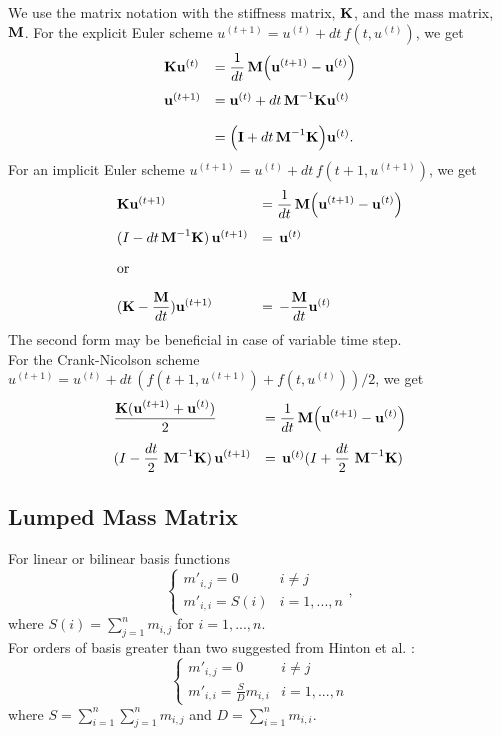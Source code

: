 We use the matrix notation with the stiffness matrix, $\textbf{K}$, and the mass matrix, $\textbf{M}$. For the explicit Euler scheme $u^{(t+1)} = u^{(t)} + dt\,f(t,u^{(t)})$, we get 
\begin{equation*}
  \begin{array}{lll}
    \textbf{K}\textbf{u}^{(t)} &= \displaystyle\frac{\displaystyle{1}}{\displaystyle{dt}}\, \textbf{M}\Big(\textbf{u}^{(t+1)} - \textbf{u}^{(t)}\Big)\\[4mm]
    \textbf{u}^{(t+1)} &= \textbf{u}^{(t)} + dt \,\textbf{M}^{-1}\textbf{K}\textbf{u}^{(t)}\\[4mm]
                 &= \Big(\textbf{I} + dt \,\textbf{M}^{-1}\textbf{K}\Big)\textbf{u}^{(t)}
                .
  \end{array}
\end{equation*}
For an implicit Euler scheme $u^{(t+1)} = u^{(t)} + dt\,f(t+1,u^{(t+1)})$, we get 
\begin{equation*}
  \begin{array}{lll}
    \textbf{K}\textbf{u}^{(t+1)} &= \displaystyle\frac{\displaystyle{1}}{\displaystyle{dt}}\, \textbf{M}\Big(\textbf{u}^{(t+1)} - \textbf{u}^{(t)}\Big)\\[4mm]
     (I - dt\,\textbf{M}^{-1}\textbf{K})\,\textbf{u}^{(t+1)}&= \,\textbf{u}^{(t)}\\[1em] \textrm{or}\\[1em]
     \displaystyle(\textbf{K}-\frac{\textbf{M}}{dt})\textbf{u}^{(t+1)}&=\,\displaystyle -\frac{\textbf{M}}{dt}\textbf{u}^{(t)}
  \end{array}
\end{equation*}
The second form may be beneficial in case of variable time step.\\[1em]
For the Crank-Nicolson scheme $u^{(t+1)} = u^{(t)} + dt\,(f(t+1,u^{(t+1)})+f(t,u^{(t)}))/2$, we get
\begin{equation*}
	\begin{array}{lll}
		\displaystyle\frac{\displaystyle{\textbf{K}(\textbf{u}^{(t+1)}+\textbf{u}^{(t)})}}{\displaystyle{2}}\, &= \displaystyle\frac{\displaystyle{1}}{\displaystyle{dt}}\, \textbf{M}\Big(\textbf{u}^{(t+1)} - \textbf{u}^{(t)}\Big)\\[4mm]
		(I - \displaystyle\frac{\displaystyle{dt}}{\displaystyle{2}}\,\,\textbf{M}^{-1}\textbf{K})\,\textbf{u}^{(t+1)}&= \,\textbf{u}^{(t)}(I + \displaystyle\frac{\displaystyle{dt}}{\displaystyle{2}}\,\,\textbf{M}^{-1}\textbf{K})
	\end{array}
\end{equation*} 
\subsection{Lumped Mass Matrix}
For linear or bilinear basis functions
\begin{equation*}
\left\{
  \begin{array}{ll}
    m'_{i,j}=0 &i\ne j\\
    m'_{i,i}=S(i) &i=1,...,n
  \end{array},
\right.
\end{equation*}
where $S(i)=\sum_{j=1}^{n}m_{i,j}$ for $i=1,...,n$.\\[0.5em]
For orders of basis greater than two suggested from Hinton et al. \cite{hinton_rock_zienkiewicz_1976}:
\begin{equation}
\left\{
  \begin{array}{ll}
	m'_{i,j}=0 &i\ne j\\
	m'_{i,i}=\frac{S}{D} m_{i,i} & i=1,...,n
  \end{array}
\right.
\end{equation}
where $S=\sum_{i=1}^{n}\sum_{j=1}^{n} m_{i,j}$ and $D=\sum_{i=1}^{n}m_{i,i}$.



